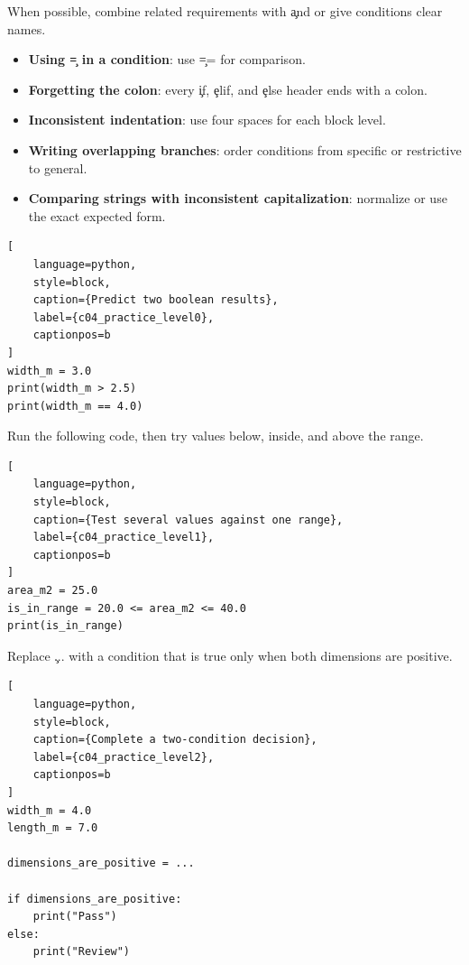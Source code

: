 When possible, combine related requirements with \c{and} or give conditions
clear names.


\begin{itemize}
    \item \textbf{Using \c{=} in a condition}: use \c{==} for comparison.
    \item \textbf{Forgetting the colon}: every \c{if}, \c{elif}, and \c{else}
          header ends with a colon.
    \item \textbf{Inconsistent indentation}: use four spaces for each block level.
    \item \textbf{Writing overlapping branches}: order conditions from specific
          or restrictive to general.
    \item \textbf{Comparing strings with inconsistent capitalization}: normalize
          or use the exact expected form.
\end{itemize}



\begin{lstlisting}[
    language=python,
    style=block,
    caption={Predict two boolean results},
    label={c04_practice_level0},
    captionpos=b
]
width_m = 3.0
print(width_m > 2.5)
print(width_m == 4.0)
\end{lstlisting}


Run the following code, then try values below, inside, and above the range.

\begin{lstlisting}[
    language=python,
    style=block,
    caption={Test several values against one range},
    label={c04_practice_level1},
    captionpos=b
]
area_m2 = 25.0
is_in_range = 20.0 <= area_m2 <= 40.0
print(is_in_range)
\end{lstlisting}


Replace \c{...} with a condition that is true only when both dimensions are
positive.

\begin{lstlisting}[
    language=python,
    style=block,
    caption={Complete a two-condition decision},
    label={c04_practice_level2},
    captionpos=b
]
width_m = 4.0
length_m = 7.0

dimensions_are_positive = ...

if dimensions_are_positive:
    print("Pass")
else:
    print("Review")
\end{lstlisting}

